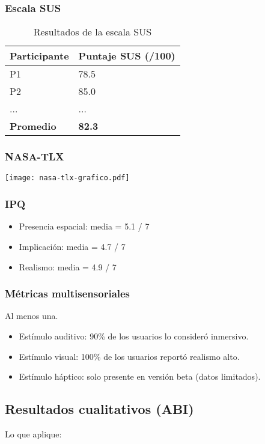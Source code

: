 \documentclass[12pt]{article}
\begin{document}
\subsubsection{Escala SUS}
\begin{table}[h!]
\centering
\begin{tabular}{@{}ll@{}}
\toprule
\textbf{Participante} & \textbf{Puntaje SUS (/100)} \\
\midrule
P1 & 78.5 \\
P2 & 85.0 \\
... & ... \\
\textbf{Promedio} & \textbf{82.3} \\
\bottomrule
\end{tabular}
\caption{Resultados de la escala SUS}
\end{table}

\subsubsection{NASA-TLX}
\texttt{[image: nasa-tlx-grafico.pdf]} %

\subsubsection{IPQ}
\begin{itemize}
    \item Presencia espacial: media = 5.1 / 7
    \item Implicación: media = 4.7 / 7
    \item Realismo: media = 4.9 / 7
\end{itemize}

\subsubsection{Métricas multisensoriales}
Al menos una.
\begin{itemize}
    \item Estímulo auditivo: 90\% de los usuarios lo consideró inmersivo.
    \item Estímulo visual: 100\% de los usuarios reportó realismo alto.
    \item Estímulo háptico: solo presente en versión beta (datos limitados).
\end{itemize}

\subsection{Resultados cualitativos (ABI)}
Lo que aplique:
\end{document}

